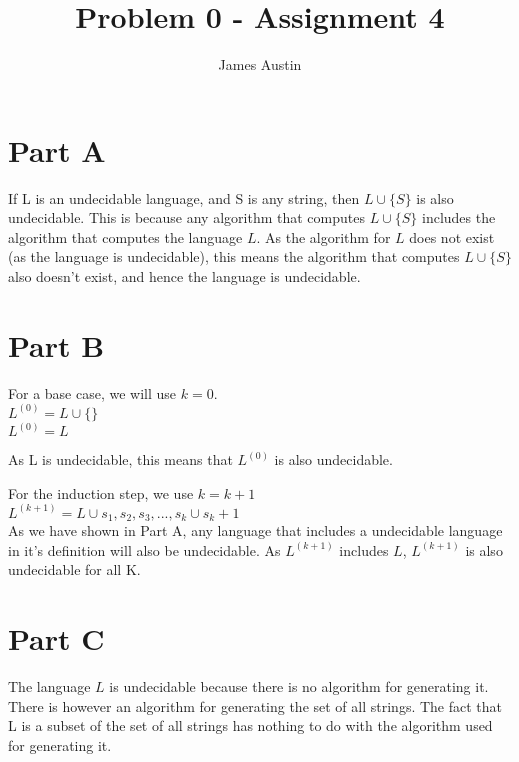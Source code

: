 \documentclass[11pt, oneside]{article}   	%
\title{Problem 0 - Assignment 4}
\author{James Austin}
\begin{document}
\maketitle
\section{Part A}
If L is an undecidable language, and S is any string, then $L \cup \{S\}$ is also undecidable. This is because any algorithm that computes $L \cup \{S\}$ includes the algorithm that computes the language $L$. As the algorithm for $L$ does not exist (as the language is undecidable), this means the algorithm that computes $L \cup \{S\}$ also doesn't exist, and hence the language is undecidable.
\section{Part B}
For a base case, we will use $k = 0$.
\\
$L^{(0)} = L \cup \{\}$
\\
$L^{(0)} = L$

As L is undecidable, this means that $L^{(0)}$ is also undecidable.

For the induction step, we use $k = k+1$\\
$L^{(k+1)} = L \cup {s_1,s_2,s_3,...,s_k} \cup {s_k+1}$\\
As we have shown in Part A, any language that includes a undecidable language in it's definition will also be undecidable. As $L^{(k+1)}$ includes $L$, $L^{(k+1)}$ is also undecidable for all K.

\section{Part C}

The language $L$ is undecidable because there is no algorithm for generating it. There is however an algorithm for generating the set of all strings. The fact that L is a subset of the set of all strings has nothing to do with the algorithm used for generating it.
\end{document}
